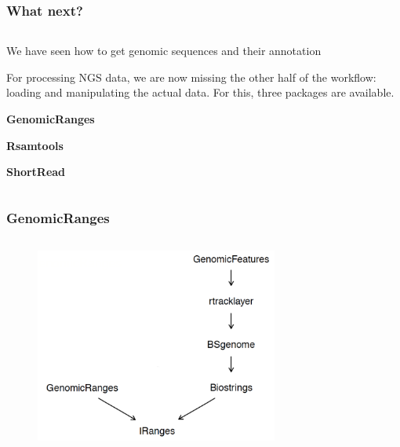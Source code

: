 \documentclass{beamer}
\begin{document}

\begin{frame}
\frametitle{What next?}
\begin{column}{1\textwidth}
  \bit
      \item We have seen how to get genomic sequences and their annotation
      \item For processing NGS data, we are now missing the other half of the workflow: loading and manipulating the actual data. For this, three packages are available.
        \bit
            \item \textbf{GenomicRanges}
            \item \textbf{Rsamtools}
            \item \textbf{ShortRead}
        \eit
  \eit
\end{column}
\end{frame}


\begin{frame}
\frametitle{GenomicRanges}
\begin{column}{1\textwidth}
    \begin{figure}[ht]
    \centering
    \includegraphics[width=80mm]{diagramas/Seleccio_008.png}
    \end{figure}
\end{column}
\end{frame}

\end{document}
